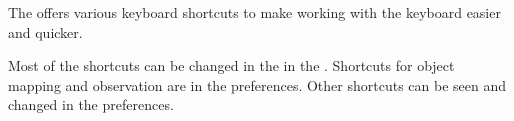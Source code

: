

The \ite{} offers various keyboard shortcuts to make working with the keyboard easier and quicker. 

Most of the shortcuts can be changed in the  in the \ite{}. Shortcuts for object mapping and observation are in the preferences. Other shortcuts can be seen and changed in the  preferences.

